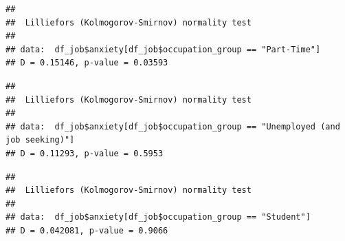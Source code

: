 \documentclass[
]{article}
\newenvironment{Shaded}{\begin{snugshade}}{\end{snugshade}}
\newcommand{\FunctionTok}[1]{\textcolor[rgb]{0.13,0.29,0.53}{\textbf{#1}}}
\newcommand{\NormalTok}[1]{#1}
\newcommand{\SpecialCharTok}[1]{\textcolor[rgb]{0.81,0.36,0.00}{\textbf{#1}}}
\newcommand{\StringTok}[1]{\textcolor[rgb]{0.31,0.60,0.02}{#1}}
\begin{document}
\begin{verbatim}
## 
##  Lilliefors (Kolmogorov-Smirnov) normality test
## 
## data:  df_job$anxiety[df_job$occupation_group == "Part-Time"]
## D = 0.15146, p-value = 0.03593
\end{verbatim}

\begin{Shaded}
\end{Shaded}

\begin{verbatim}
## 
##  Lilliefors (Kolmogorov-Smirnov) normality test
## 
## data:  df_job$anxiety[df_job$occupation_group == "Unemployed (and job seeking)"]
## D = 0.11293, p-value = 0.5953
\end{verbatim}

\begin{Shaded}
\end{Shaded}

\begin{verbatim}
## 
##  Lilliefors (Kolmogorov-Smirnov) normality test
## 
## data:  df_job$anxiety[df_job$occupation_group == "Student"]
## D = 0.042081, p-value = 0.9066
\end{verbatim}
\end{document}
